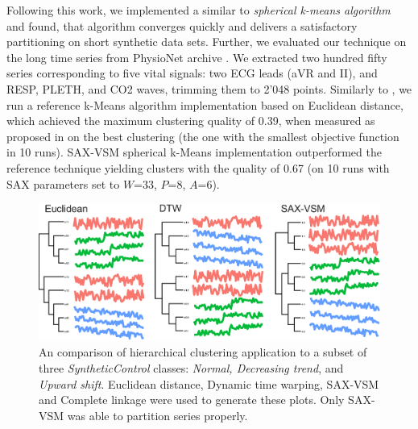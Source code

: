 Following this work, we implemented a similar to \cite{citeulike:1172599} \textit{spherical k-means algorithm}
and found, that algorithm converges quickly and delivers a satisfactory partitioning on short
synthetic data sets. Further, we evaluated our technique on the long time series from PhysioNet 
archive \cite{citeulike:699487}. 
We extracted two hundred fifty series corresponding to five vital signals: two ECG leads 
(aVR and II), and RESP, PLETH, and CO2 waves, trimming them to 2'048 points. Similarly to
\cite{citeulike:10525778}, we run a reference k-Means algorithm implementation based on Euclidean
distance, which achieved the maximum clustering quality of 0.39, when measured as proposed in
\cite{citeulike:1325189} on the best clustering (the one with the smallest objective function in 10 runs). 
SAX-VSM spherical k-Means implementation outperformed the reference technique yielding 
clusters  with the quality of 0.67 (on 10 runs with SAX parameters set to 
$W$=33, $P$=8, $A$=6).


\begin{figure}[ht]
   \centering
   \includegraphics[width=120mm]{figures/clustering.eps}
   \caption{An comparison of hierarchical clustering application to a subset of three
   \textit{SyntheticControl} classes: \textit{Normal, Decreasing trend}, and \textit{Upward shift}. 
   Euclidean distance, Dynamic time warping, SAX-VSM and Complete linkage were used to 
   generate these plots. Only SAX-VSM was able to partition series properly.                       
   }
   \label{fig:hc}
\end{figure}

